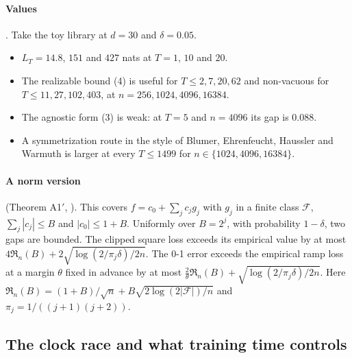\paragraph{Values} . Take the toy library at $d=30$ and $\delta=0.05$.
\begin{itemize}[nosep]
\item $L_T=14.8$, $151$ and $427$ nats at $T=1$, $10$ and $20$.
\item The realizable bound (4) is useful for $T\le2,7,20,62$ and non-vacuous for $T\le11,27,102,403$, at $n=256,1024,4096,16384$.
\item The agnostic form (3) is weak: at $T=5$ and $n=4096$ its gap is $0.088$.
\item A symmetrization route in the style of Blumer, Ehrenfeucht, Haussler and Warmuth is larger at every $T\le1499$ for $n\in\{1024,4096,16384\}$.
\end{itemize}

\paragraph{A norm version} (Theorem A1$'$, ). This covers $f=c_0+\sum_jc_jg_j$ with $g_j$ in a finite class $\mathcal F$, $\sum_j|c_j|\le B$ and $|c_0|\le1+B$. Uniformly over $B=2^j$, with probability $1-\delta$, two gaps are bounded. The clipped square loss exceeds its empirical value by at most $4\mathfrak R_n(B)+2\sqrt{\log(2/\pi_j\delta)/2n}$. The 0-1 error exceeds the empirical ramp loss at a margin $\theta$ fixed in advance by at most $\frac2\theta\mathfrak R_n(B)+\sqrt{\log(2/\pi_j\delta)/2n}$. Here $\mathfrak R_n(B)=(1+B)/\sqrt n+B\sqrt{2\log(2|\mathcal F|)/n}$ and $\pi_j=1/((j+1)(j+2))$.

\subsection{The clock race and what training time controls}\label{app:discrete:time}

